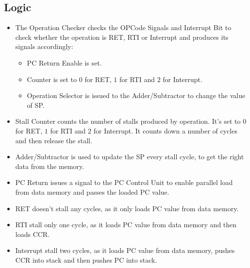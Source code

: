 \subsection{Logic}
\begin{itemize}
    \item The Operation Checker checks the OPCode Signals and Interrupt Bit to check whether the operation is RET, RTI or Interrupt and produces its signals accordingly:
    \begin{itemize}
        \item PC Return Enable is set.
        \item Counter is set to $0$ for RET, $1$ for RTI and $2$ for Interrupt.
        \item Operation Selector is issued to the Adder/Subtractor to change the value of SP.
    \end{itemize}
    \item Stall Counter counts the number of stalls produced by operation. It's set to $0$ for RET, $1$ for RTI and $2$ for Interrupt. It counts down a number of cycles and then release the stall.
    \item Adder/Subtractor is used to update the SP every stall cycle, to get the right data from the memory.
    \item PC Return issues a signal to the PC Control Unit to enable parallel load from data memory and passes the loaded PC value.
    \item RET doesn't stall any cycles, as it only loads PC value from data memory.
    \item RTI stall only one cycle, as it loads PC value from data memory and then loads CCR.
    \item Interrupt stall two cycles, as it loads PC value from data memory, pushes CCR into stack and then pushes PC into stack.
\end{itemize}
